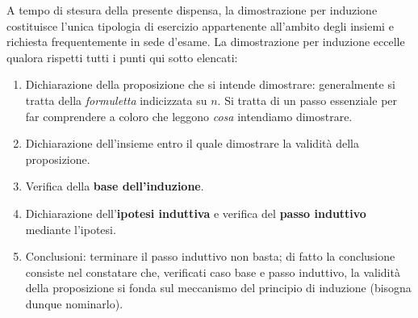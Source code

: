 \documentclass[oneside]{book}
\begin{document}
A tempo di stesura della presente dispensa, la dimostrazione per induzione
costituisce l'unica tipologia di esercizio appartenente all'ambito degli
insiemi e richiesta frequentemente in sede d'esame.
La dimostrazione per induzione eccelle qualora rispetti tutti i punti qui
sotto elencati:
\begin{enumerate}
\item Dichiarazione della proposizione che si intende dimostrare:
generalmente si tratta della \textit{formuletta} indicizzata su $n$.
Si tratta di un passo essenziale per far comprendere a coloro che
leggono \textit{cosa} intendiamo dimostrare.
\item Dichiarazione dell'insieme entro il quale dimostrare la
validità della proposizione.
\item Verifica della \textbf{base dell'induzione}.
\item Dichiarazione dell'\textbf{ipotesi induttiva} e verifica del
\textbf{passo induttivo} mediante l'ipotesi.
\item Conclusioni: terminare il passo induttivo non basta; di fatto
la conclusione consiste nel constatare che, verificati caso base e
passo induttivo, la validità della proposizione si fonda sul meccanismo
del principio di induzione (bisogna dunque nominarlo).
\end{enumerate}
\end{document}
